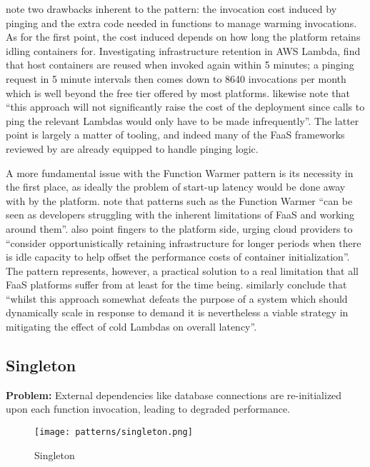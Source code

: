 \textcite{leitner18industrialpractice} note two drawbacks inherent to the pattern: the invocation cost induced by pinging and the extra code needed in functions to manage warming invocations. As for the first point, the cost induced depends on how long the platform retains idling containers for. Investigating infrastructure retention in AWS Lambda, \textcite{lloydserverless} find that host containers are reused when invoked again within 5 minutes; a pinging request in 5 minute intervals then comes down to 8640 invocations per month which is well beyond the free tier offered by most platforms. \textcite{bardsley18optimizationStrategies} likewise note that ``this approach will not significantly raise the cost of the deployment since calls to ping the relevant Lambdas would only have to be made infrequently''. The latter point is largely a matter of tooling, and indeed many of the FaaS frameworks reviewed by \textcite{kritikos18frameworks} are already equipped to handle pinging logic.

A more fundamental issue with the Function Warmer pattern is its necessity in the first place, as ideally the problem of start-up latency would be done away with by the platform. \textcite{leitner18industrialpractice} note that patterns such as the Function Warmer ``can be seen as developers struggling with the inherent limitations of FaaS and working around them''. \textcite{lloydserverless} also point fingers to the platform side, urging cloud providers to ``consider opportunistically retaining infrastructure for longer periods when there is idle capacity to help offset the performance costs of container initialization''. The pattern represents, however, a practical solution to a real limitation that all FaaS platforms suffer from at least for the time being. \textcite{bardsley18optimizationStrategies} similarly conclude that ``whilst this approach somewhat defeats the purpose of a system which should dynamically scale in response to demand it is nevertheless a viable strategy in mitigating the effect of cold Lambdas on overall latency''.

\subsection{Singleton} \label{subsec:Singleton}

\textbf{Problem:} External dependencies like database connections are re-initialized upon each function invocation, leading to degraded performance.

\begin{figure}[h]
  \centering
  \texttt{[image: patterns/singleton.png]}
  \caption{Singleton}
  \label{fig:singleton}
\end{figure}

